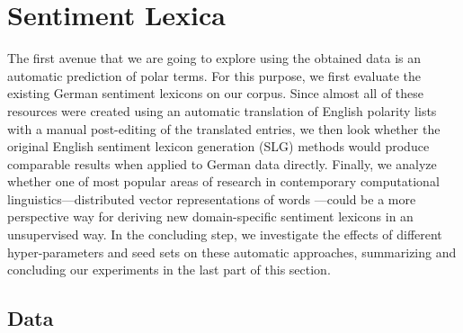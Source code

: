 

\section{Sentiment Lexica}\label{sec:snt:lex}

The first avenue that we are going to explore using the obtained data
is an automatic prediction of polar terms.
For this purpose, we first evaluate the existing German sentiment
lexicons on our corpus.  Since almost all of these resources were
created using an automatic translation of English polarity lists with
a manual post-editing of the translated entries, we then look whether
the original English sentiment lexicon generation (SLG) methods would
produce comparable results when applied to German data directly.
Finally, we analyze whether one of most popular areas of research in
contemporary computational linguistics---distributed vector
representations of words \cite{Mikolov:13}---could be a more
perspective way for deriving new domain-specific sentiment lexicons in
an unsupervised way.  In the concluding step, we investigate the
effects of different hyper-parameters and seed sets on these automatic
approaches, summarizing and concluding our experiments in the last
part of this section.

\subsection{Data}\label{subsec:snt-lex:data}

